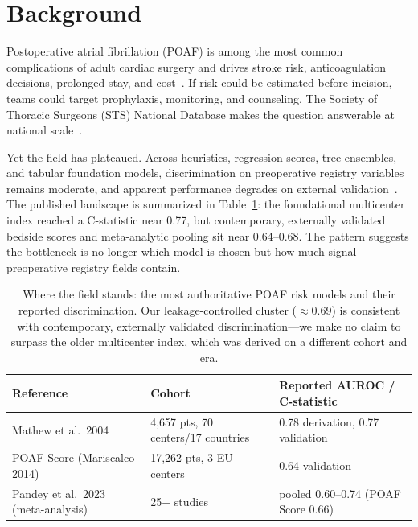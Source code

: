 \documentclass[11pt]{article}
\begin{document}
\section{Background}

Postoperative atrial fibrillation (POAF) is among the most common complications of adult
cardiac surgery and drives stroke risk, anticoagulation decisions, prolonged stay, and
cost~\cite{mathew2004,pandey2023}. If risk could be estimated before incision, teams could
target prophylaxis, monitoring, and counseling. The Society of Thoracic Surgeons (STS)
National Database makes the question answerable at national
scale~\cite{stsDatabase,stsPoafGuideline2026}.

Yet the field has plateaued. Across heuristics, regression scores, tree ensembles, and
tabular foundation models, discrimination on preoperative registry variables remains
moderate, and apparent performance degrades on external
validation~\cite{pollock2018,pandey2023,andrei2024}. The published landscape is summarized in
Table~\ref{tab:prior}: the foundational multicenter index reached a C-statistic near 0.77, but
contemporary, externally validated bedside scores and meta-analytic pooling sit near
0.64--0.68. The pattern suggests the bottleneck is no longer which model is chosen but how
much signal preoperative registry fields contain.

\begin{table}[t]
\centering
\begin{threeparttable}
\caption{Where the field stands: the most authoritative POAF risk models and their reported
discrimination. Our leakage-controlled cluster ($\approx$0.69) is consistent with
contemporary, externally validated discrimination---we make no claim to surpass the older
multicenter index, which was derived on a different cohort and era.}
\label{tab:prior}
\small
\begin{tabular}{lll}
\toprule
Reference & Cohort & Reported AUROC / C-statistic \\
\midrule
Mathew et al.\ 2004~\cite{mathew2004} & 4{,}657 pts, 70 centers/17 countries & 0.78 derivation, 0.77 validation \\
POAF Score (Mariscalco 2014)~\cite{mariscalco2014} & 17{,}262 pts, 3 EU centers & 0.64 validation \\
Pandey et al.\ 2023 (meta-analysis)~\cite{pandey2023} & 25+ studies & pooled 0.60--0.74 (POAF Score 0.66) \\
\bottomrule
\end{tabular}
\end{threeparttable}
\end{table}
\end{document}
